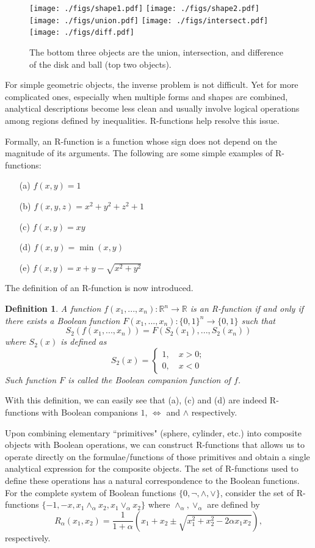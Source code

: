 \documentclass[11pt,reqno]{amsart}
\newtheorem{definition}{Definition}%
\theoremstyle{definition}
\begin{document}
\begin{figure}
\texttt{[image: ./figs/shape1.pdf]}
\texttt{[image: ./figs/shape2.pdf]}
\\
\texttt{[image: ./figs/union.pdf]}
\texttt{[image: ./figs/intersect.pdf]}
\texttt{[image: ./figs/diff.pdf]}
\caption{The bottom three objects are the union, intersection, and difference of the disk and ball (top two objects).}
\label{DiskAndBall}
\end{figure}

For simple geometric objects, the inverse problem is not
difficult. Yet for more complicated ones, especially when multiple forms
and shapes are combined, analytical descriptions become less clean and usually involve logical operations among regions defined by inequalities. 
R-functions help resolve this issue.    

Formally, an R-function is a function whose sign does not depend on the magnitude of its arguments.  The following are some simple  examples of R-functions: 
\begin{enumerate}
\item[(a)] $f(x,y) = 1$
\item[(b)] $f(x,y,z) = x^2+y^2+z^2+1$
\item[(c)] $f(x,y) = xy$
\end{enumerate}

\begin{enumerate}
\item[(d)] $f(x,y) = \min(x,y)$
\item[(e)] $f(x,y) = x+y-\sqrt{x^2+y^2}$
\end{enumerate}
The definition of an R-function is now introduced.
\begin{definition}
A function $f(x_1,...,x_n):\mathbb{R}^n\to\mathbb{R}$ is an R-function if and only if there exists a Boolean function $F(x_1,...,x_n):\{0,1\}^n\to \{0,1\}$ such that
$$S_2(f(x_1,...,x_n))=F(S_2(x_1),...,S_2(x_n))$$
where $S_2(x)$ is defined as
$$S_2(x)=\begin{cases} 1,\quad x>0;\\ 0, \quad x<0\end{cases}$$
Such function $F$ is called the Boolean companion function of $f$.
\end{definition}

With this definition, we can easily see that (a), (c) and (d) are indeed R-functions with Boolean companions $1$, $\Leftrightarrow$ and $\wedge$
respectively. 

Upon combining elementary ``primitives" (sphere, cylinder, etc.) into composite objects with Boolean operations, we can construct R-functions that allows us to operate directly on the formulae/functions of those primitives and obtain a single analytical expression for the composite objects. The set of R-functions used to define these operations has a natural correspondence to the Boolean functions. For the complete system of Boolean functions $\{0, \neg, \wedge, \vee\}$, consider the set of R-functions $\{-1,-x, x_1\wedge_\alpha x_2, x_1\vee_\alpha x_2\}$ where $\wedge_\alpha, \vee_\alpha$ are defined by
\[
R_\alpha(x_1,x_2)=\frac{1}{1+\alpha} \left(x_1+x_2\pm \sqrt{x_1^2+x_2^2-2\alpha x_1x_2}\right),
\]
respectively.
\end{document}
